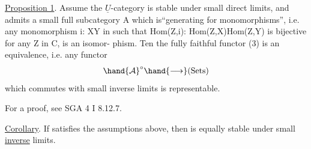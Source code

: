 \uline{Proposition 1}.   Assume the $\underline{U}$-category  is stable under small direct
limits,  and admits a small full subcategory A which is\hand{|}``generating for
monomorphisms'',  i.e.  any monomorphism i: X\hand{$\rightarrow$}Y in   such that
Hom(Z,i): Hom(Z,X)\hand{$\rightarrow$}Hom(Z,Y)  is bijective for any Z in C,  is an isomor-%
phism.  Ten the fully faithful functor (3) is an equivalence,  i.e. any
functor
\[ \hand{\mathcal{A}}^{\circ} \hand{\longrightarrow} (\mathrm{Sets}) \]
which commutes with small inverse limits is representable.

For a proof,  see SGA 4 I  8.12.7.

\uline{Corollary}. If  satisfies the assumptions above,  then  is equally
stable under small \uline{inverse} limits.

